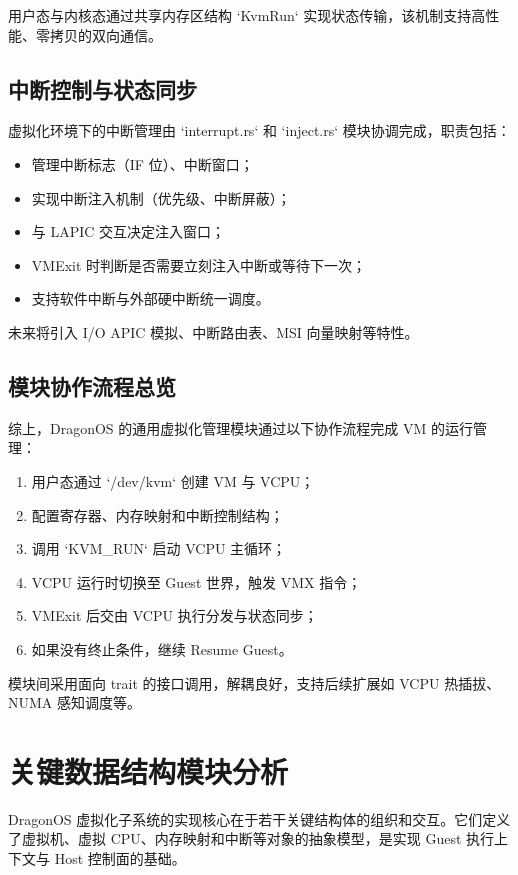 \documentclass[analyze]{mancls}
\begin{document}
用户态与内核态通过共享内存区结构 `KvmRun` 实现状态传输，该机制支持高性能、零拷贝的双向通信。

\subsection{中断控制与状态同步}
虚拟化环境下的中断管理由 `interrupt.rs` 和 `inject.rs` 模块协调完成，职责包括：

\begin{itemize}
    \item 管理中断标志（IF 位）、中断窗口；
    \item 实现中断注入机制（优先级、中断屏蔽）；
    \item 与 LAPIC 交互决定注入窗口；
    \item VMExit 时判断是否需要立刻注入中断或等待下一次；
    \item 支持软件中断与外部硬中断统一调度。
\end{itemize}

未来将引入 I/O APIC 模拟、中断路由表、MSI 向量映射等特性。

\subsection{模块协作流程总览}
综上，DragonOS 的通用虚拟化管理模块通过以下协作流程完成 VM 的运行管理：

\begin{enumerate}
    \item 用户态通过 `/dev/kvm` 创建 VM 与 VCPU；
    \item 配置寄存器、内存映射和中断控制结构；
    \item 调用 `KVM\_RUN` 启动 VCPU 主循环；
    \item VCPU 运行时切换至 Guest 世界，触发 VMX 指令；
    \item VMExit 后交由 VCPU 执行分发与状态同步；
    \item 如果没有终止条件，继续 Resume Guest。
\end{enumerate}

模块间采用面向 trait 的接口调用，解耦良好，支持后续扩展如 VCPU 热插拔、NUMA 感知调度等。


\section{关键数据结构模块分析}

DragonOS 虚拟化子系统的实现核心在于若干关键结构体的组织和交互。它们定义了虚拟机、虚拟 CPU、内存映射和中断等对象的抽象模型，是实现 Guest 执行上下文与 Host 控制面的基础。
\end{document}
